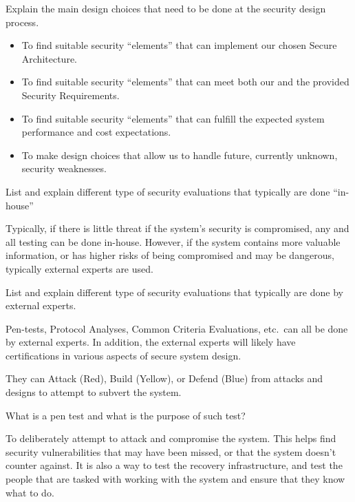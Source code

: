 \begin{questions}
\question{} Explain the main design choices that need to be done at the security design process.
  \begin{solution}
    \begin{itemize}[noitemsep]
    \item To find suitable security ``elements'' that can implement our chosen Secure Architecture.
    \item To find suitable security ``elements'' that can meet both our and the provided Security Requirements.
    \item To find suitable security ``elements'' that can fulfill the expected system performance and cost expectations.
    \item To make design choices that allow us to handle future, currently unknown, security weaknesses.
    \end{itemize}
  \end{solution}

\question{} List and explain different type of security evaluations that typically are done ``in-house''
  \begin{solution}
    Typically, if there is little threat if the system's security is compromised, any and all testing can be done in-house.
    However, if the system contains more valuable information, or has higher risks of being compromised and may be dangerous, typically external experts are used.
  \end{solution}

\question{} List and explain different type of security evaluations that typically are done by external experts.
  \begin{solution}
    Pen-tests, Protocol Analyses, Common Criteria Evaluations, etc.\ can all be done by external experts.
    In addition, the external experts will likely have certifications in various aspects of secure system design.

    They can Attack (Red), Build (Yellow), or Defend (Blue) from attacks and designs to attempt to subvert the system.
  \end{solution}

\question{} What is a pen test and what is the purpose of such test?
  \begin{solution}
    To deliberately attempt to attack and compromise the system.
    This helps find security vulnerabilities that may have been missed, or that the system doesn't counter against.
    It is also a way to test the recovery infrastructure, and test the people that are tasked with working with the system and ensure that they know what to do.
  \end{solution}


\end{questions}
